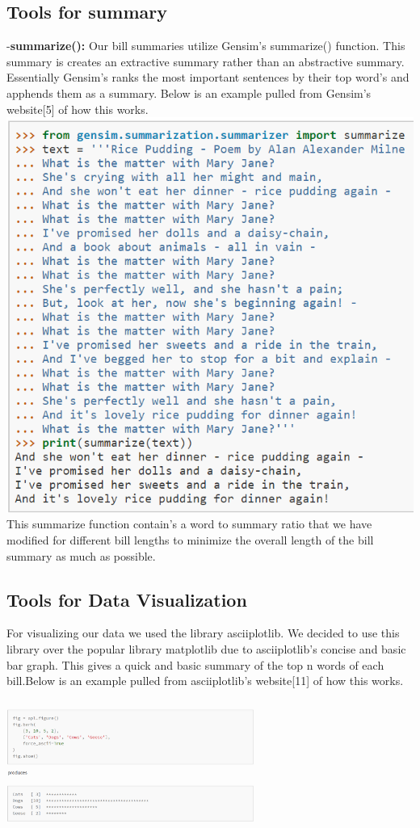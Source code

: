 \documentclass[11pt,a4paper]{article}
\begin{document}
\subsection{Tools for summary}
-\textbf{summarize():}
Our bill summaries utilize Gensim's summarize() function. This summary is creates an extractive summary rather than an abstractive summary. Essentially Gensim's ranks the most important sentences by their top word's and apphends them as a summary. Below is an example pulled from Gensim's website[5] of how this works. 
\newline
\includegraphics[scale = .68]{figs/summarizer.PNG}
This summarize function contain's a word to summary ratio that we have modified for different bill lengths to minimize the overall length of the bill summary as much as possible.

\subsection{Tools for Data Visualization}
For visualizing our data we used the library asciiplotlib. We decided to use this library over the popular library matplotlib due to asciiplotlib's concise and basic bar graph. This gives a quick and basic summary of the top n words of each bill.Below is an example pulled from asciiplotlib's website[11] of how this works.
\includegraphics[width=8.1cm, height=5cm]{figs/asciiplot.PNG}
\end{document}
